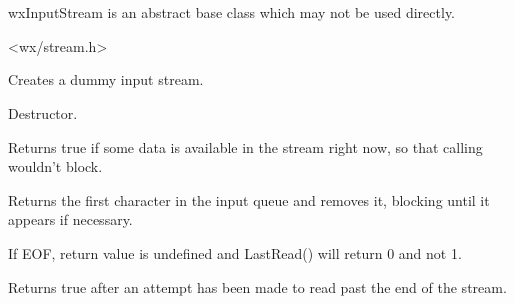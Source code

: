 \section{}\label{wxinputstream}

wxInputStream is an abstract base class which may not be used directly.




<wx/stream.h>


\label{wxinputstreamctor}


Creates a dummy input stream.

\label{wxinputstreamdtor}


Destructor.

\label{wxinputstreamcanread}


Returns true if some data is available in the stream right now, so that
calling  wouldn't block.

\label{wxinputstreamgetc}


Returns the first character in the input queue and removes it, 
blocking until it appears if necessary.


If EOF, return value is undefined and LastRead() will return 0 and not 1.

\label{wxinputstreameof}


Returns true after an attempt has been made to read past the end of the
stream.



